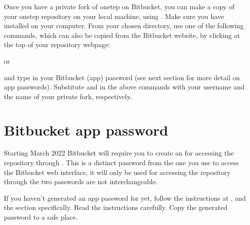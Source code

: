 \documentclass[letterpaper,10pt,english]{sphinxmanual}
\begin{document}
\begin{DUlineblock}{0em}
\item[] Once you have a private fork of onetep on Bitbucket, you can make a
copy of your onetep repository on your local machine, using
. Make sure you have  installed on your computer.
From your chosen directory, use one of the following commands, which
can also be copied from the Bitbucket website, by clicking  at
the top of your repository webpage:
\item[] 
\item[]
\begin{DUlineblock}{\DUlineblockindent}
\item[] or
\end{DUlineblock}
\item[] 
\item[] and type in your Bitbucket (app) password (see next section for more
detail on app passwords). Substitute  and
 in the above commands with your username and the name
of your private fork, respectively.
\end{DUlineblock}


\section{Bitbucket app password}
\label{\detokenize{starting_with_onetep:bitbucket-app-password}}
Starting March 2022 Bitbucket will require you to create an  for accessing the repository through . This is a
distinct password from the one you use to access the Bitbucket web
interface, it will only be used for accessing the repository through
 \textendash{} the two passwords are not interchangeable.

If you haven’t generated an app password for  yet, follow the
instructions at
, and
the  section specifically. Read the instructions
carefully. Copy the generated password to a safe place.
\end{document}
